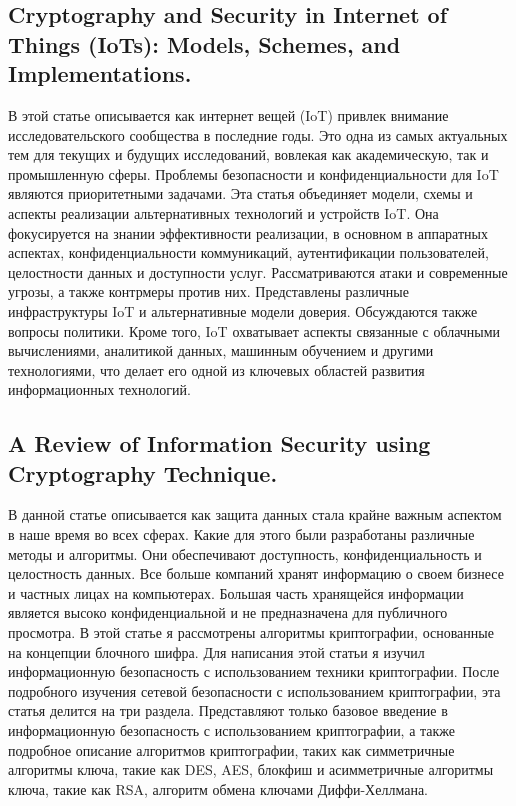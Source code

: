 \documentclass[14pt]{extarticle}
\begin{document}
\subsection{Cryptography and Security in Internet of Things (IoTs): Models, Schemes, and Implementations.\cite{Article4}}

В этой статье описывается как интернет вещей (IoT) привлек внимание исследовательского сообщества в последние годы. Это одна из самых актуальных тем для текущих и будущих исследований, вовлекая как академическую, так и промышленную сферы. Проблемы безопасности и конфиденциальности для IoT являются приоритетными задачами. Эта статья объединяет модели, схемы и аспекты реализации альтернативных технологий и устройств IoT. Она фокусируется на знании эффективности реализации, в основном в аппаратных аспектах, конфиденциальности коммуникаций, аутентификации пользователей, целостности данных и доступности услуг. Рассматриваются атаки и современные угрозы, а также контрмеры против них. Представлены различные инфраструктуры IoT и альтернативные модели доверия. Обсуждаются также вопросы политики. Кроме того, IoT охватывает аспекты связанные с облачными вычислениями, аналитикой данных, машинным обучением и другими технологиями, что делает его одной из ключевых областей развития информационных технологий.

\subsection{A Review of Information Security using Cryptography Technique.\cite{Article5}}

В данной статье описывается как защита данных стала крайне важным аспектом в наше время во всех сферах. Какие для этого были разработаны различные методы и алгоритмы. Они обеспечивают доступность, конфиденциальность и целостность данных. Все больше компаний хранят информацию о своем бизнесе и частных лицах на компьютерах. Большая часть хранящейся информации является высоко конфиденциальной и не предназначена для публичного просмотра. В этой статье я рассмотрены алгоритмы криптографии, основанные на концепции блочного шифра. Для написания этой статьи я изучил информационную безопасность с использованием техники криптографии. После подробного изучения сетевой безопасности с использованием криптографии, эта статья делится на три раздела. Представляют только базовое введение в информационную безопасность с использованием криптографии, а также подробное описание алгоритмов криптографии, таких как симметричные алгоритмы ключа, такие как DES, AES, блокфиш и асимметричные алгоритмы ключа, такие как RSA, алгоритм обмена ключами Диффи-Хеллмана.
\end{document}
